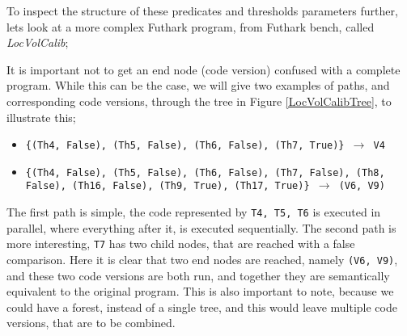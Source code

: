 \begin{center}
	\centering 
	
	\label{MatMultTreeFilled}
\end{center}
To inspect the structure of these predicates and thresholds parameters further, lets look at a more complex Futhark program, from Futhark bench, called \textit{LocVolCalib};
\begin{center}
	\centering
	
	\label{LocVolCalibTree}
\end{center}
\noindent It is important not to get an end node (code version) confused with a complete program. While this can be the case, we will give two examples of paths, and corresponding code versions, through the tree in Figure \ref{LocVolCalibTree}, to illustrate this;
\begin{itemize}
	\item \texttt{\{(Th4, False), (Th5, False), (Th6, False), (Th7, True)\} $\to$ V4}
	\item \texttt{\{(Th4, False), (Th5, False), (Th6, False), (Th7, False), (Th8, False), (Th16, False), (Th9, True), (Th17, True)\} $\to$ (V6, V9)}
\end{itemize}  
The first path is simple, the code represented by \texttt{T4, T5, T6} is
executed in parallel, where everything after it, is executed sequentially. The
second path is more interesting, \texttt{T7} has two child nodes, that are
reached with a false comparison. Here it is clear that two end nodes are
reached, namely \texttt{(V6, V9)}, and these two code versions are both run,
and together they are semantically equivalent to the original program. This is
also important to note, because we could have a forest, instead of a single
tree, and this would leave multiple code versions, that are to be combined.



